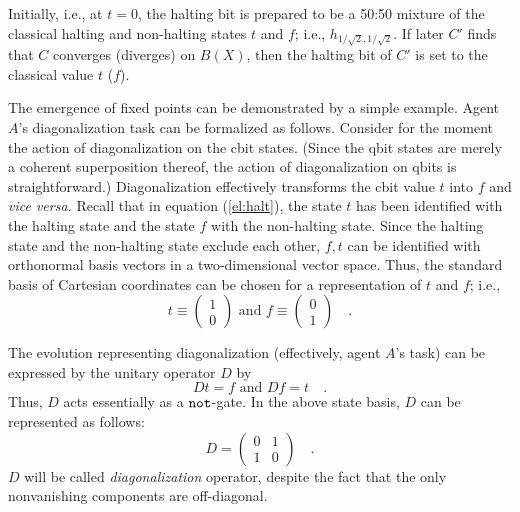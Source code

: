 Initially, i.e.,
at
$t=0$, the halting bit is prepared to be a 50:50 mixture of the
classical halting and non-halting states $t$ and $f$; i.e.,
$h_{1/\sqrt{2} , 1/\sqrt{2} }$. If later $C'$ finds that $C$ converges
(diverges) on $B(X)$, then the halting bit of $C'$ is set to the
classical value $t$ ($f$).


The emergence of fixed points can be demonstrated by a simple example.
Agent $A$'s diagonalization task can be formalized as
follows. Consider for the moment the action of diagonalization  on the
cbit states. (Since the qbit states are merely a coherent superposition
thereof, the action of diagonalization on qbits is straightforward.)
Diagonalization effectively transforms the cbit value $t$ into $f$ and
{\it vice versa.}
Recall that in equation
(\ref{el:halt}),  the state
$t$ has been identified
 with the halting state and the state $f$
with the non-halting
state. Since the halting state and the non-halting state exclude each
other,
$f,t$ can be identified with orthonormal basis vectors  in a
two-dimensional vector space. Thus, the standard basis of
Cartesian coordinates can be chosen for a representation of $t$ and $f$;
i.e.,
\begin{equation}
t  \equiv
\left(
\begin{array}{c}
1 \\
0
 \end{array}
\right)
\mbox{ and }
f \equiv
\left(
\begin{array}{c}
0 \\
1
 \end{array}
\right) \quad .
\end{equation}

 The evolution representing diagonalization (effectively, agent
$A$'s task) can be expressed by the unitary operator $D$ by
\begin{equation}
D t  =  f \mbox{ and }
D f  =  t\quad .
\end{equation}
Thus, $D$ acts essentially as a ${\tt not}$-gate.
In the above state basis, $D$ can be represented as follows:
\begin{equation}
D=
\left(
\begin{array}{cc}
0 & 1\\
1 & 0
\end{array}
\right) \quad .
\end{equation}
$ D $ will be called {\em diagonalization} operator, despite the fact
that the only nonvanishing components are off-diagonal.


